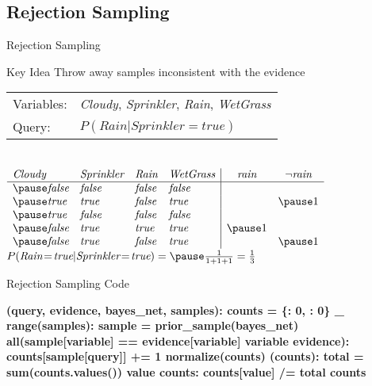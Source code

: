 \documentclass[14pt]{beamer}
\begin{document}
\subsection{Rejection Sampling}


\begin{frame}[fragile]{Rejection Sampling}
	\begin{block}{Key Idea}
		Throw away samples inconsistent with the evidence
	\end{block}
	\medskip
	\pause
	\begin{tabular}{ll}
		Variables: & \textit{Cloudy}, \textit{Sprinkler}, \textit{Rain}, \textit{WetGrass} \\
		Query:     & $P(\textit{Rain}|\textit{Sprinkler}\!=\!\textit{true})$
	\end{tabular}
	\\
	\medskip
	$
	\begin{array}{llll|cc}
		\textit{Cloudy} & \textit{Sprinkler} & \textit{Rain}  & \textit{WetGrass} & \textit{rain} & \lnot\textit{rain} \\
		\hline
		\pause
		\textit{false}  & \textit{false}     & \textit{false} & \textit{false}    &           &            \\
		\pause
		\textit{true}   & \textit{true}      & \textit{false} & \textit{true}     &           & \pause 1   \\
		\pause
		\textit{true}   & \textit{false}     & \textit{false} & \textit{false}    &           &            \\
		\pause
		\textit{false}  & \textit{true}      & \textit{true}  & \textit{true}     & \pause 1  &            \\
		\pause
		\textit{false}  & \textit{true}      & \textit{false} & \textit{true}     &           & \pause 1
	\end{array}
	$
	\\
	\medskip
	\pause
	\tab$P(\textit{Rain}\!=\!\textit{true}|\textit{Sprinkler}\!=\!\textit{true})=\pause\frac{1}{1 + 1 + 1}=\frac{1}{3}$
\end{frame}

\begin{frame}[fragile]{Rejection Sampling Code}
\begin{semiverbatim}\scriptsize\bfseries
{} (query, evidence, bayes_net, samples):
    \pause{}
    counts = \{: \num{0}, : \num{0}\}
     _  range(samples):
        sample = prior_sample(bayes_net)
        \pause{}
         all(sample[variable] == evidence[variable]  variable  evidence):
            counts[sample[query]] += \num{1}
    \pause{}
     normalize(counts)
\pause
{} (counts):
    \pause{}
    total = sum(counts.values())
     value  counts:
        counts[value] /= total
     counts
\end{semiverbatim}
\end{frame}
\end{document}
